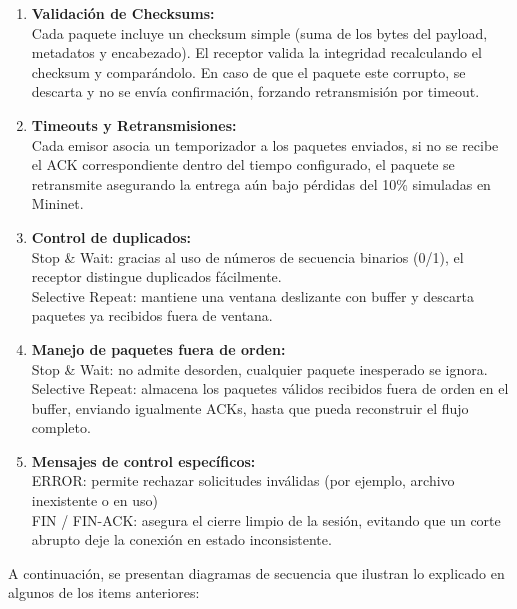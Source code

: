\begin{enumerate} [label=\roman*. , leftmargin=2cm]
    \item \textbf{Validación de Checksums:}\\
    Cada paquete incluye un checksum simple (suma de los bytes del payload, metadatos y encabezado). El receptor valida la integridad recalculando el checksum y comparándolo. En caso de que el paquete este corrupto, se descarta y no se envía confirmación, forzando retransmisión por timeout.

    \item \textbf{Timeouts y Retransmisiones:}\\
    Cada emisor asocia un temporizador a los paquetes enviados, si no se recibe el ACK correspondiente dentro del tiempo configurado, el paquete se retransmite asegurando la entrega aún bajo pérdidas del 10\% simuladas en Mininet.

    \item \textbf{Control de duplicados:}\\
    Stop \& Wait: gracias al uso de números de secuencia binarios (0/1), el receptor distingue duplicados fácilmente.\\
    Selective Repeat: mantiene una ventana deslizante con buffer y descarta paquetes ya recibidos fuera de ventana.

    \item \textbf{Manejo de paquetes fuera de orden:}\\
    Stop \& Wait: no admite desorden, cualquier paquete inesperado se ignora.\\
    Selective Repeat: almacena los paquetes válidos recibidos fuera de orden en el buffer, enviando igualmente ACKs, hasta que pueda reconstruir el flujo completo.

    \item \textbf{Mensajes de control específicos:}\\
    ERROR: permite rechazar solicitudes inválidas (por ejemplo, archivo inexistente o en uso) \\
    FIN / FIN-ACK: asegura el cierre limpio de la sesión, evitando que un corte abrupto deje la conexión en estado inconsistente.

\end{enumerate}
A continuación, se presentan diagramas de secuencia que ilustran lo explicado en algunos de los items anteriores:

